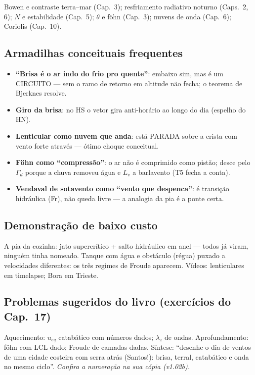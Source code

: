 Bowen e contraste terra--mar (Cap.~3); resfriamento radiativo noturno
(Caps.~2, 6); $N$ e estabilidade (Cap.~5); $\theta$ e föhn (Cap.~3);
nuvens de onda (Cap.~6); Coriolis (Cap.~10).

\subsection*{Armadilhas conceituais frequentes}

\begin{itemize}
  \item \textbf{``Brisa é o ar indo do frio pro quente''}: embaixo
        sim, mas é um CIRCUITO — sem o ramo de retorno em altitude
        não fecha; o teorema de Bjerknes resolve.
  \item \textbf{Giro da brisa}: no HS o vetor gira anti-horário ao
        longo do dia (espelho do HN).
  \item \textbf{Lenticular como nuvem que anda}: está PARADA sobre a
        crista com vento forte através — ótimo choque conceitual.
  \item \textbf{Föhn como ``compressão''}: o ar não é comprimido como
        pistão; desce pelo $\Gamma_d$ porque a chuva removeu água e
        $L_v$ a barlavento (T5 fecha a conta).
  \item \textbf{Vendaval de sotavento como ``vento que despenca''}: é
        transição hidráulica (Fr), não queda livre — a analogia da
        pia é a ponte certa.
\end{itemize}

\subsection*{Demonstração de baixo custo}

A pia da cozinha: jato supercrítico + salto hidráulico em anel —
todos já viram, ninguém tinha nomeado. Tanque com água e obstáculo
(régua) puxado a velocidades diferentes: os três regimes de Froude
aparecem. Vídeos: lenticulares em timelapse; Bora em Trieste.

\subsection*{Problemas sugeridos do livro (exercícios do Cap.~17)}

Aquecimento: $u_{eq}$ catabático com números dados; $\lambda_z$ de
ondas. Aprofundamento: föhn com LCL dado; Froude de camadas dadas.
Síntese: ``desenhe o dia de ventos de uma cidade costeira com serra
atrás (Santos!): brisa, terral, catabático e onda no mesmo ciclo''.
\emph{Confira a numeração na sua cópia (v1.02b).}

